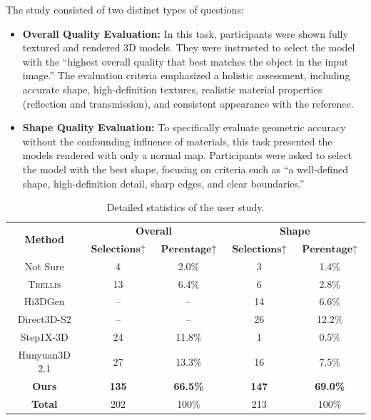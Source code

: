 \documentclass[10pt,twocolumn,letterpaper]{article}
\begin{document}
The study consisted of two distinct types of questions:
\begin{itemize}
    \item \textbf{Overall Quality Evaluation:} In this task, participants were shown fully textured and rendered 3D models. They were instructed to select the model with the ``highest overall quality that best matches the object in the input image.'' The evaluation criteria emphasized a holistic assessment, including accurate shape, high-definition textures, realistic material properties (reflection and transmission), and consistent appearance with the reference.

    \item \textbf{Shape Quality Evaluation:} To specifically evaluate geometric accuracy without the confounding influence of materials, this task presented the models rendered with only a normal map. Participants were asked to select the model with the best shape, focusing on criteria such as ``a well-defined shape, high-definition detail, sharp edges, and clear boundaries.''
\end{itemize}

\begin{table}[t]
    \vspace{8pt}
	\centering  
	\scriptsize
    \caption{Detailed statistics of the user study.}
    \vspace{-8pt}
	\setlength{\tabcolsep}{4pt}
	\begin{tabular}{c|cc|cc}  
		\toprule 
		\multirow{2}{*}{\textbf{Method}} & \multicolumn{2}{c|}{\textbf{Overall}} & \multicolumn{2}{c}{\textbf{Shape}} \\
        & $\textbf{Selections}\!\uparrow$ & $\textbf{Perentage}\!\uparrow$ & $\textbf{Selections}\!\uparrow$ & $\textbf{Perentage}\!\uparrow$ \\
		\midrule
        Not Sure & 4 & 2.0\% & 3 & 1.4\% \\
		\textsc{Trellis} & 13 & 6.4\% & 6 & 2.8\% \\
		Hi3DGen & -- & -- & 14 & 6.6\% \\
        Direct3D-S2 & -- & -- & 26 & 12.2\% \\
		Step1X-3D & 24 & 11.8\% & 1 & 0.5\% \\
        Hunyuan3D 2.1 & 27 & 13.3\% & 16 & 7.5\% \\
		\textbf{Ours} & \textbf{135} & \textbf{66.5\%} & \textbf{147} & \textbf{69.0\%} \\
        \midrule
        \textbf{Total} & 202 & 100\% & 213 & 100\% \\
		\bottomrule
	\end{tabular}  
	\label{tab:user_study}  
\end{table} 
\end{document}
